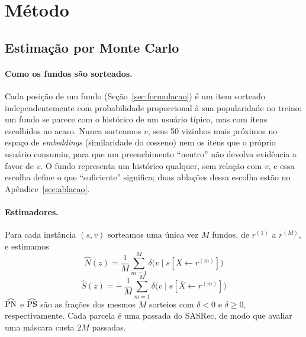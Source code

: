 \section{Método}

\subsection{Estimação por Monte Carlo}
\label{sec:mc}

\paragraph{Como os fundos são sorteados.}
Cada posição de um fundo (Seção~\ref{sec:formulacao}) é um item sorteado
independentemente com probabilidade proporcional à sua popularidade no treino:
um fundo se parece com o histórico de um usuário típico, mas com itens
escolhidos ao acaso. Nunca sorteamos $v$,
seus 50 vizinhos mais próximos no espaço de \emph{embeddings} (similaridade do
cosseno) nem os itens que o próprio usuário consumiu, para que um
preenchimento ``neutro'' não devolva evidência a favor de $v$. O fundo
representa um histórico qualquer, sem relação com $v$, e essa escolha define o
que ``suficiente'' significa; duas ablações dessa escolha estão no
Apêndice~\ref{sec:ablacao}.

\paragraph{Estimadores.}
Para cada instância $(s,v)$ sorteamos uma única vez $M$ fundos, de
$r^{(1)}$ a $r^{(M)}$, e estimamos
\begin{equation}
  \hat N(z) = \frac{1}{M} \sum_{m=1}^{M} \delta\big(v \mid s[X \leftarrow r^{(m)}]\big)
  \label{eq:Nhat}
\end{equation}
\begin{equation}
  \hat S(z) = -\,\frac{1}{M} \sum_{m=1}^{M} \delta\big(v \mid s[\bar X \leftarrow r^{(m)}]\big)
  \label{eq:Shat}
\end{equation}
$\widehat{\mathrm{PN}}$ e $\widehat{\mathrm{PS}}$ são as frações dos mesmos $M$ sorteios com
$\delta<0$ e $\delta\ge0$, respectivamente. Cada parcela é uma passada do
SASRec, de modo que avaliar uma máscara custa $2M$ passadas.

